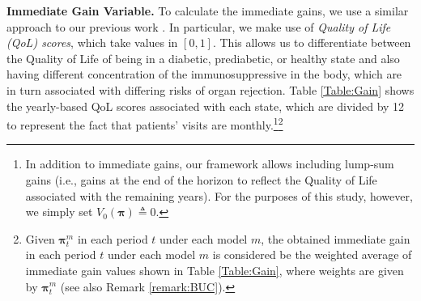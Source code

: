 \documentclass[opre,nonblindrev]{informs2}%
\newcommand{\teq}{\triangleq}
\newcommand{\1}{\hbox{\rm 1\kern-.35em 1}}
\newcommand{\bpi}{\boldsymbol{\pi}}
\begin{document}
\noindent\textbf{Immediate Gain Variable.} To calculate the immediate gains, we use a similar approach to our previous work \citep[see, e.g.,][]{Boloori2020}. In particular, we make use of {\em Quality of Life (QoL) scores}, which take values in $[0,1]$. This allows us to differentiate between the Quality of Life of being in a diabetic, prediabetic,  or healthy state and also having different concentration of the immunosuppressive in the body, which are in turn associated with differing risks of organ rejection. Table  \ref{Table:Gain} shows the yearly-based QoL scores associated with each state, which are divided by 12 to represent the fact that patients' visits are monthly.\footnote{In addition to immediate gains, our framework  allows including lump-sum gains (i.e., gains at the end of the horizon to reflect the Quality of Life associated with the remaining years). For the purposes of this study, however, we simply set $V_0(\bpi)\teq 0$.}\footnote{Given $\bpi^m_t$ in each period $t$ under each model $m$, the obtained immediate gain in each period $t$ under each model $m$ is considered be the weighted average of immediate gain values shown in Table  \ref{Table:Gain}, where weights are given by $\bpi^m_t$ (see also Remark \ref{remark:BUC}).}
\end{document}
